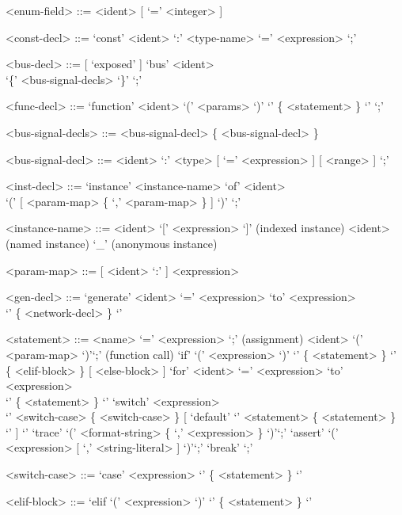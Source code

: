 \documentclass{article}
\begin{document}
\begin{grammar}
  <enum-field> ::= <ident> [ `=' <integer> ]
  
  <const-decl> ::= `const' <ident> `:' <type-name> `=' <expression> `;'

  <bus-decl> ::= [ `exposed' ] `bus' <ident> \\ `\{' <bus-signal-decls> `\}'  `;'

  <func-decl> ::= `function' <ident> `(' <params> `)' `{' \{ <statement> \}  `}' `;'


  <bus-signal-decls> ::= <bus-signal-decl> \{ <bus-signal-decl> \}

  <bus-signal-decl> ::= <ident> `:' <type> [ `=' <expression> ] [ <range> ] `;'

  <inst-decl> ::= `instance' <instance-name> `of' <ident> \\`(' [ <param-map> 
  \{ `,' <param-map> \} ] `)' `;'

  <instance-name> ::= <ident> `[' <expression> `]' (indexed instance)
  \alt <ident> (named instance)
  \alt `_' (anonymous instance)

  <param-map> ::= [ <ident> `:' ] <expression>

  <gen-decl> ::= `generate' <ident> `=' <expression> `to' <expression> \\ `{' \{ <network-decl> \} `}'

  <statement> ::= <name> `=' <expression> `;' (assignment)
  \alt <ident> `(' <param-map> `)'`;' (function call) 
  \alt `if' `(' <expression> `)' `{' \{ <statement> \} `}' \\ \{ <elif-block>
    \} [ <else-block> ]
  \alt `for' <ident> `=' <expression> `to' <expression> \\ `{' \{ <statement> \} `}'
  \alt `switch' <expression> \\ `{' <switch-case> \{ <switch-case> \} [ `default' `{' <statement> \{ <statement> \} `}' ] `}'
  \alt `trace' `(' <format-string> \{ `,' <expression> \} `)'`;'
  \alt `assert' `(' <expression> [ `,' <string-literal> ] `)'`;'
  \alt `break' `;'

  <switch-case> ::= `case' <expression> `{' \{ <statement> \} `}'

  <elif-block> ::= `elif `(' <expression> `)' `{' \{ <statement> \} `}'


\end{grammar}
\end{document}
